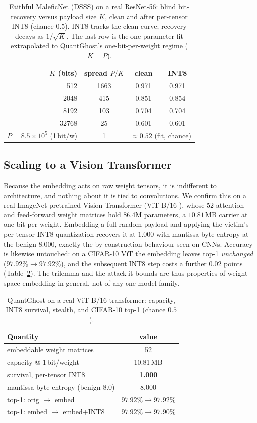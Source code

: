 \documentclass[a4paper,fleqn]{cas-dc}
\theoremstyle{plain}
\theoremstyle{remark}
\newcommand{\sys}{\mbox{QuantGhost}}
\begin{document}
\begin{table}[!tb]\centering
\caption{Faithful MaleficNet (DSSS) on a real ResNet-56: blind bit-recovery versus payload
size $K$, clean and after per-tensor INT8 (chance $0.5$). INT8 tracks the clean curve; recovery
decays as $1/\sqrt{K}$. The last row is the one-parameter fit extrapolated to \sys's
one-bit-per-weight regime ($K=P$).}
\label{tab:maleficnet}
\small
\begin{tabular*}{\columnwidth}{@{\extracolsep{\fill}}rccc@{}}
\toprule
$K$ (bits) & spread $P/K$ & clean & INT8\\
\midrule
512 & 1663 & 0.971 & 0.971\\
2048 & 415 & 0.851 & 0.854\\
8192 & 103 & 0.704 & 0.704\\
32768 & 25 & 0.601 & 0.601\\
\midrule
$P=8.5\times10^{5}$ (1\,bit/w) & 1 & \multicolumn{2}{c}{$\approx 0.52$ (fit, chance)}\\
\bottomrule
\end{tabular*}
\end{table}

\subsection{Scaling to a Vision Transformer}\label{sec:vit}
Because the embedding acts on raw weight tensors, it is indifferent to architecture, and
nothing about it is tied to convolutions. We confirm this on a real ImageNet-pretrained
Vision Transformer (ViT-B/16 \cite{dosovitskiy2021vit}), whose $52$ attention and
feed-forward weight matrices hold $86.4$M parameters, a $10.81$\,MB carrier at one bit per
weight. Embedding a full random payload and applying the victim's per-tensor INT8
quantization recovers it at $1.000$ with mantissa-byte entropy at the benign $8.000$,
exactly the by-construction behaviour seen on CNNs. Accuracy is likewise untouched: on a
CIFAR-10 ViT the embedding leaves top-1 \emph{unchanged} ($97.92\%\!\to\!97.92\%$), and the
subsequent INT8 step costs a further $0.02$ points (Table~\ref{tab:vit}). The trilemma and
the attack it bounds are thus properties of weight-space embedding in general, not of any
one model family.

\begin{table}[!tb]\centering
\caption{\sys{} on a real ViT-B/16 transformer: capacity, INT8 survival, stealth, and
CIFAR-10 top-1 (chance $0.5$).}
\label{tab:vit}
\begin{tabular*}{\columnwidth}{@{\extracolsep{\fill}}lc@{}}
\toprule
Quantity & value\\
\midrule
embeddable weight matrices & 52\\
capacity @ 1\,bit/weight & 10.81\,MB\\
survival, per-tensor INT8 & \textbf{1.000}\\
mantissa-byte entropy (benign $8.0$) & 8.000\\
top-1: orig $\to$ embed & $97.92\%\to97.92\%$\\
top-1: embed $\to$ embed$+$INT8 & $97.92\%\to97.90\%$\\
\bottomrule
\end{tabular*}
\end{table}
\end{document}
